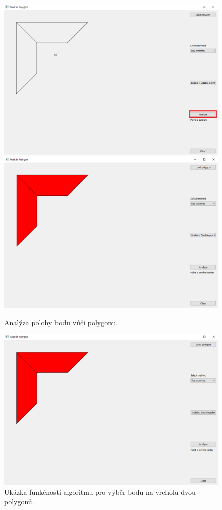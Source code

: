 \documentclass[a4paper, 12pt, oneside, titlepage]{article} %
\begin{document}
\begin{figure}[!htb]
	\centering
	\includegraphics[scale=0.285]{obrazky/app_analyze.png} 
	\includegraphics[scale=0.285]{obrazky/bod_na_rozhr.png}
	\caption{Analýza polohy bodu vůči polygonu.
	}
	\label{fig:app_analyze}
\end{figure} 
\FloatBarrier

\begin{figure}[!htb]
	\centering
	\includegraphics[scale=0.5]{obrazky/bod_na_vrcholu.png} 
	\caption{Ukázka funkčnosti algoritmu pro výběr bodu na vrcholu dvou polygonů.
	}
	\label{fig:bod_na_vrcholu}
\end{figure} 
\FloatBarrier
\end{document}

